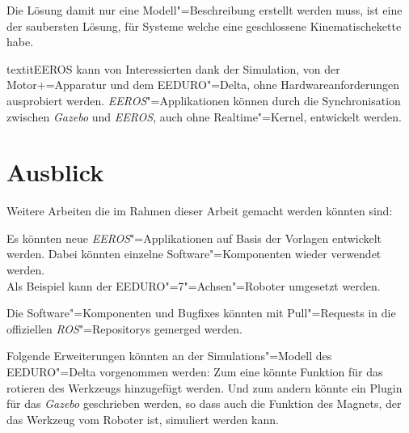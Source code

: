 Die Lösung damit nur eine Modell"=Beschreibung erstellt werden muss, ist eine der saubersten Lösung, für Systeme welche eine geschlossene Kinematischekette habe.

textit{EEROS} kann von Interessierten dank der Simulation, von der Motor+=Apparatur und dem EEDURO"=Delta, ohne Hardwareanforderungen ausprobiert werden.
\textit{EEROS}"=Applikationen können durch die Synchronisation zwischen \textit{Gazebo} und \textit{EEROS}, auch ohne Realtime"=Kernel, entwickelt werden.

 

\section{Ausblick}

Weitere Arbeiten die im Rahmen dieser Arbeit gemacht werden könnten sind:

Es könnten neue \textit{EEROS}"=Applikationen auf Basis der Vorlagen entwickelt werden.
Dabei könnten einzelne Software"=Komponenten wieder verwendet werden.\\
Als Beispiel kann der EEDURO"=7"=Achsen"=Roboter umgesetzt werden.

Die Software"=Komponenten und Bugfixes könnten mit Pull"=Requests in die offiziellen \textit{ROS}"=Repositorys gemerged werden.

Folgende Erweiterungen könnten an der Simulations"=Modell des EEDURO"=Delta vorgenommen werden:
Zum eine könnte Funktion für das rotieren des Werkzeugs hinzugefügt werden.
Und zum andern könnte ein Plugin für das \textit{Gazebo} geschrieben werden, so dass auch die Funktion des Magnets, der das Werkzeug vom Roboter ist, simuliert werden kann.


